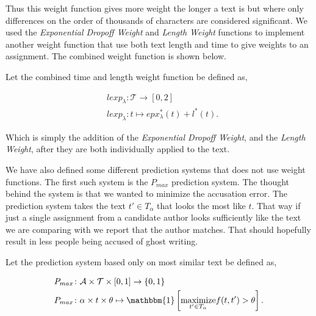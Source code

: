 Thus this weight function gives more weight the longer a text is but where only
differences on the order of thousands of characters are considered significant.
We used the \textit{Exponential Dropoff Weight} and \textit{Length Weight}
functions to implement another weight function that use both text length and
time to give weights to an assignment. The combined weight function is shown
below.

\begin{definition}

    Let the combined time and length weight function be defined as,

    \begin{align}
        &lexp_\lambda \colon \mathcal{T} \rightarrow [0, 2] \\
        &lexp_\lambda \colon t \mapsto epx^*_\lambda(t) + l^*(t).
    \end{align}

\end{definition}

Which is simply the addition of the \textit{Exponential Dropoff Weight}, and the
\textit{Length Weight}, after they are both individually applied to the text.

We have also defined some different prediction systems that does not use weight
functions. The first such system is the $P_{max}$ prediction system. The thought
behind the system is that we wanted to minimize the accusation error. The
prediction system takes the text $t' \in T_\alpha$ that looks the most like $t$.
That way if just a single assignment from a candidate author looks sufficiently
like the text we are comparing with we report that the author matches. That
should hopefully result in less people being accused of ghost writing.

\begin{definition}
    \label{def:maximum_prediction_system}

    Let the prediction system based only on most similar text be defined as,

    \begin{align}
        &P_{max} \colon \mathcal{A} \times \mathcal{T} \times [0, 1] \rightarrow
            \{0, 1\} \\
        &P_{max} \colon \alpha \times t \times \theta \mapsto \mathbbm{1}\left[
                \underset{t' \in T_\alpha}{\text{maximize}} f(t, t') > \theta
            \right].
    \end{align}

\end{definition}

